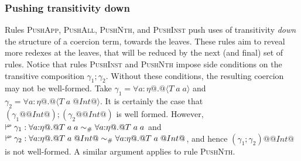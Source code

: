 \documentclass[a4paper,UKenglish]{lipics}
\makeatletter
\def\fiddle#1{\hspace*{-0.8ex}\raisebox{0.1ex}{$\scriptscriptstyle#1$}}
\def\rulename#1{\textsc{#1}}
\newcommand{\wfco}{\vdash^{\fiddle{\sf{co}}}}
\newcommand{\psim}{\mathrel{\sim_{\tiny \#}}}
\def\rulename#1{\textsc{#1}}
\newcommand{\inst}[2]{#1@#2}
\newcommand{\refl}[1]{\langle#1\rangle}  %
\makeatother
\begin{document}
\subsubsection{Pushing transitivity down}
Rules \rulename{PushApp}, \rulename{PushAll}, \rulename{PushNth}, and \rulename{PushInst} push uses of transitivity
{\em down} the structure of a coercion term, towards the leaves. These rules aim to reveal more redexes
at the leaves, that will be reduced by the next (and final) set of rules. Notice that rules \rulename{PushInst} and \rulename{PushNth}
impose side conditions on the transitive composition $\gamma_1;\gamma_2$. Without these conditions, the resulting coercion may not be well-formed.
Take $\gamma_1 = \forall a{:}\eta @.@ \refl{T\;a\;a}$ and $\gamma_2 = \forall a{:}\eta @.@ \refl{T\;a\;@Int@}$. It is 
certainly the case that $(\inst{\gamma_1}{@Int@});(\inst{\gamma_2}{@Int@})$ is well formed. However, $\wfco \gamma_1 : \forall a{:}\eta @.@ T\;a\;a \psim \forall a{:}\eta @.@ T\;a\;a$
and $\wfco \gamma_2 : \forall a{:}\eta @.@ T\;a\;@Int@ \psim \forall a{:}\eta @.@ T\;a\;@Int@$, and hence $\inst{(\gamma_1;\gamma_2)}{@Int@}$ is not well-formed. A similar argument 
applies to rule \rulename{PushNth}. 
\end{document}
